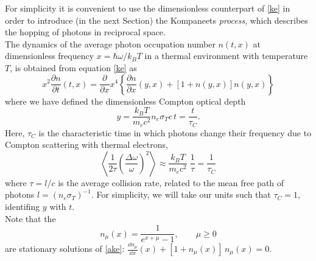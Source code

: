 \documentclass[a4paper,12pt,reqno,superscriptaddress,nofootinbib]{revtex4}
\newcommand{\0}{^{(0)}}
\newcommand{\1}{^{(1)}}
\newcommand{\2}{^{(2)}}
\begin{document}
For simplicity it is convenient to use the dimensionless counterpart of \eqref{ke} in order to introduce (in the next Section) the Kompaneets {\it process}, which describes the hopping of photons in reciprocal space.\\ 
The dynamics of the average photon occupation number $n(t, x)$ at dimensionless frequency $x= \hbar \omega/k_B T$ in a thermal environment with temperature $T$, is obtained from equation \eqref{ke} as
\begin{equation}\label{ake}
x^2\frac{\partial n}{\partial t}(t,x) = \frac{\partial }{\partial x}x^4\left\{
\frac{\partial n}{\partial x}(y,x) + 
\left[1+n(y,x)\right]n(y,x)\right\}
\end{equation}
where we have defined the dimensionless Compton optical depth
\[y = \frac{ k_B T }{m_e c^2} n_e \sigma_T c \, t =  \frac{ t}{\tau_C}.\]
Here, $\tau_C$ is the  characteristic time in which photons change their frequency due to Compton scattering with thermal electrons,
\begin{equation}\label{shift}
\left\langle\frac{1}{2\tau}\left(\frac{\Delta\omega}{\omega}\right)^2\right\rangle\approx \frac{ k_B T }{m_e c^2}\; \frac 1{\tau}= \frac{1}{\tau_C}
\end{equation}
where $\tau = l/c$ is the average collision rate, related 
to the mean free path of photons $l=(n_e\sigma_T)^{-1}$. For simplicity, we will take our units such that $\tau_C = 1$, identifing $y$ with $t$.\\
Note that the
\begin{equation}\label{cc}
n_\mu(x) = \frac 1{e^{x+\mu}-1}, \qquad \mu\geq 0
\end{equation}
are stationary solutions of \eqref{ake}: $\frac{\dd n_\mu}{\dd x}(x) + [ 
1+n_\mu(x) ] \,n_\mu(x)=0$.\\
\end{document}
